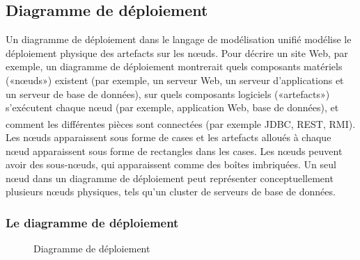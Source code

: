 \documentclass[12pt]{report}
\begin{document}
\newpage

\subsection{Diagramme de déploiement}

Un diagramme de déploiement dans le langage de modélisation unifié modélise le déploiement physique des artefacts sur les nœuds. Pour décrire un site Web, par exemple, un diagramme de déploiement montrerait quels composants matériels («nœuds») existent (par exemple, un serveur Web, un serveur d’applications et un serveur de base de données), sur quels composants logiciels («artefacts») s’exécutent chaque nœud (par exemple, application Web, base de données), et comment les différentes pièces sont connectées (par exemple JDBC, REST, RMI).\textsuperscript{\cite{UIS}}
\\
Les nœuds apparaissent sous forme de cases et les artefacts alloués à chaque nœud apparaissent sous forme de rectangles dans les cases. Les nœuds peuvent avoir des sous-nœuds, qui apparaissent comme des boîtes imbriquées. Un seul nœud dans un diagramme de déploiement peut représenter conceptuellement plusieurs nœuds physiques, tels qu'un cluster de serveurs de base de données.

\vspace{0.2in}

\subsubsection{Le diagramme de déploiement}

\vspace{0.2in}

\begin{figure}[h]
\centering
    \centerline{}
    \caption{Diagramme de déploiement}
\end{figure}
\end{document}
